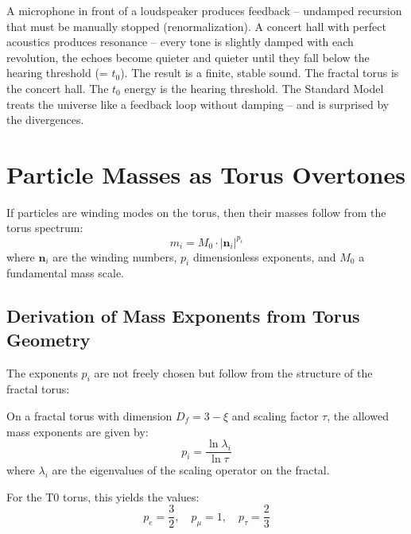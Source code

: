 	\begin{keypoint}
		A microphone in front of a loudspeaker produces feedback -- undamped recursion that must be manually stopped (renormalization). A concert hall with perfect acoustics produces resonance -- every tone is slightly damped with each revolution, the echoes become quieter and quieter until they fall below the hearing threshold (= $t_0$). The result is a finite, stable sound. The fractal torus is the concert hall. The $t_0$ energy is the hearing threshold. The Standard Model treats the universe like a feedback loop without damping -- and is surprised by the divergences.
	\end{keypoint}


	\section{Particle Masses as Torus Overtones}
	
	If particles are winding modes on the torus, then their masses follow from the torus spectrum:
	\begin{equation}
		m_i = M_0 \cdot |\mathbf{n}_i|^{p_i}
		\label{eq:mass-scaling}
	\end{equation}
	where $\mathbf{n}_i$ are the winding numbers, $p_i$ dimensionless exponents, and $M_0$ a fundamental mass scale.
	
	\subsection{Derivation of Mass Exponents from Torus Geometry}
	
	The exponents $p_i$ are not freely chosen but follow from the structure of the fractal torus:
	
	\begin{keypoint}
		On a fractal torus with dimension $D_f = 3 - \xi$ and scaling factor $\tau$, the allowed mass exponents are given by:
		\begin{equation}
			p_i = \frac{\ln \lambda_i}{\ln \tau}
		\end{equation}
		where $\lambda_i$ are the eigenvalues of the scaling operator on the fractal.
	\end{keypoint}
	
	For the T0 torus, this yields the values:
	\begin{equation}
		p_e = \frac{3}{2}, \quad p_\mu = 1, \quad p_\tau = \frac{2}{3}
	\end{equation}
	
